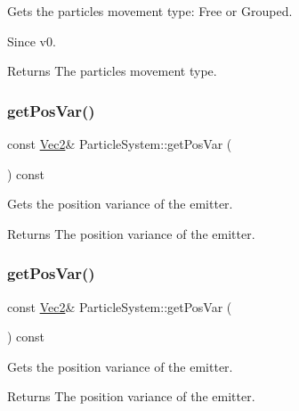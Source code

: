 Gets the particles movement type\+: Free or Grouped. \begin{DoxySince}{Since}
v0.
\end{DoxySince}
\begin{DoxyReturn}{Returns}
The particles movement type. 
\end{DoxyReturn}
\mbox{\label{classParticleSystem_a8c2d579f46f0f6bb70a604503ad68fba}} 
\subsubsection{\texorpdfstring{get\+Pos\+Var()}{getPosVar()}\hspace{0.1cm}{\footnotesize\ttfamily [1/2]}}
{\footnotesize\ttfamily const \hyperlink{classVec2}{Vec2}\& Particle\+System\+::get\+Pos\+Var (\begin{DoxyParamCaption}{ }\end{DoxyParamCaption}) const\hspace{0.3cm}{\ttfamily [inline]}}

Gets the position variance of the emitter.

\begin{DoxyReturn}{Returns}
The position variance of the emitter. 
\end{DoxyReturn}
\mbox{\label{classParticleSystem_a8c2d579f46f0f6bb70a604503ad68fba}} 
\subsubsection{\texorpdfstring{get\+Pos\+Var()}{getPosVar()}\hspace{0.1cm}{\footnotesize\ttfamily [2/2]}}
{\footnotesize\ttfamily const \hyperlink{classVec2}{Vec2}\& Particle\+System\+::get\+Pos\+Var (\begin{DoxyParamCaption}{ }\end{DoxyParamCaption}) const\hspace{0.3cm}{\ttfamily [inline]}}

Gets the position variance of the emitter.

\begin{DoxyReturn}{Returns}
The position variance of the emitter. 
\end{DoxyReturn}
\mbox{\label{classParticleSystem_af1f7c2c3ea55156b38fc51436a9dd419}} 
